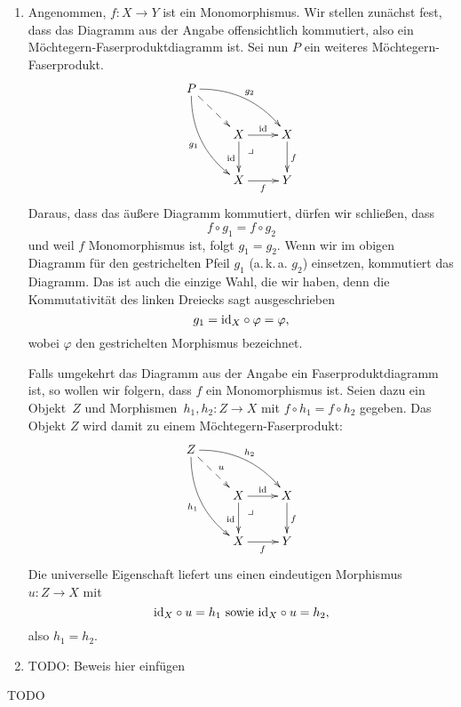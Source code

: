\documentclass{pizzablatt}
\begin{document}
\begin{aufgabe}{}
\begin{enumerate}
\item Angenommen, $f:X \to Y$ ist ein Monomorphismus. Wir stellen zunächst fest, dass das Diagramm aus der Angabe offensichtlich kommutiert, also ein Möchte\-gern-Faser\-produkt\-diagramm ist. Sei nun $P$ ein weiteres Möchtegern-Faserprodukt.
\[ \xymatrix{
  P \ar@/_1pc/[ddr]_{g_{1}} \ar@/^1pc/[rrd]^{g_{2}} \ar@{-->}[rd] \\
  & \ar @{} [dr] |{\begin{array}{l}\lrcorner\ \ \ \ \ \ \\\\\end{array}}
  X \ar[r]^\id \ar[d]_\id & X \ar[d]^f \\
  & X \ar[r]_f & Y
} \]
Daraus, dass das äußere Diagramm kommutiert, dürfen wir schließen, dass
\[ f \circ g_{1} = f \circ g_{2} \]
und weil $f$ Monomorphismus ist, folgt $g_{1} = g_{2}$.
Wenn wir im obigen Diagramm für den gestrichelten Pfeil $g_{1}$ (a.\,k.\,a. $g_{2}$) einsetzen, kommutiert das Diagramm. Das ist auch die einzige Wahl, die wir haben, denn die Kommutativität des linken Dreiecks sagt ausgeschrieben
\[ g_{1} = \mathrm{id}_{X} \circ \varphi = \varphi, \]
wobei $\varphi$ den gestrichelten Morphismus bezeichnet.

Falls umgekehrt das Diagramm aus der Angabe ein Faser\-produkt\-diagramm ist, so wollen wir folgern, dass $f$ ein Monomorphismus ist. Seien dazu ein Objekt~$Z$ und Morphismen~$h_{1}, h_{2} : Z \to X$ mit $f \circ h_{1} = f \circ h_{2}$ gegeben. Das Objekt $Z$ wird damit zu einem Möchte\-gern-Faser\-produkt:
\[ \xymatrix{
  Z \ar@/_1pc/[ddr]_{h_{1}} \ar@/^1pc/[rrd]^{h_{2}} \ar@{-->}[rd]^{u} \\
  & \ar @{} [dr] |{\begin{array}{l}\lrcorner\ \ \ \ \ \ \\\\\end{array}}
  X \ar[r]^\id \ar[d]_\id & X \ar[d]^f \\
  & X \ar[r]_f & Y
} \]
Die universelle Eigenschaft liefert uns einen eindeutigen Morphismus $u:Z \to X$ mit
\[ \mathrm{id}_{X} \circ u = h_{1} \text{ sowie } \mathrm{id}_{X} \circ u = h_{2}, \]
also $h_{1} = h_{2}$.

\item TODO: Beweis hier einfügen
\end{enumerate}
\end{aufgabe}

\begin{aufgabe}{}
TODO
\end{aufgabe}
\end{document}
